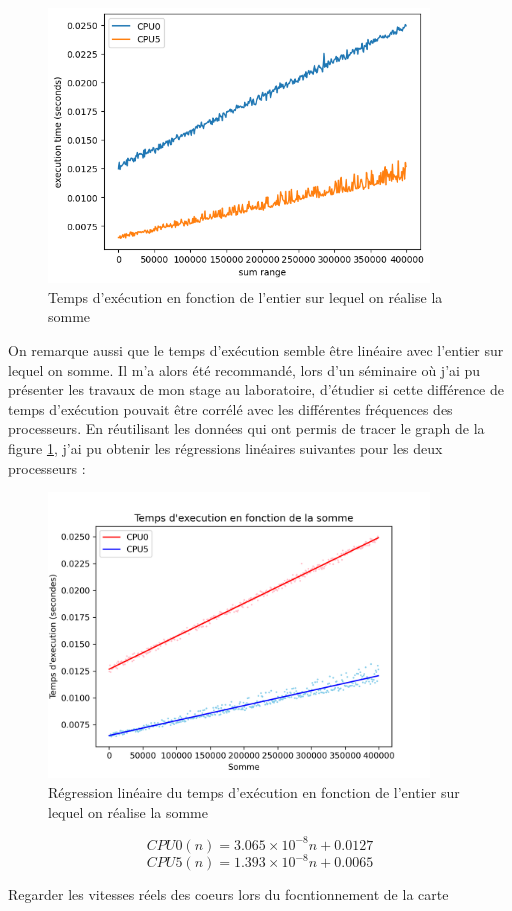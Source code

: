 \begin{figure}[H]
    \centering
    \includegraphics[width=0.9\textwidth]{Images/graphSum0and5.png}
    \caption{Temps d'exécution en fonction de l'entier sur lequel on réalise la somme}
    \label{fig:sum_int}    
\end{figure}


On remarque aussi que le temps d'exécution semble être linéaire avec l'entier sur lequel on somme. Il m'a alors été recommandé, lors d'un séminaire où j'ai pu présenter les travaux de mon stage au laboratoire, d'étudier si cette différence de temps d'exécution pouvait être corrélé avec les différentes fréquences des processeurs. En réutilisant les données qui ont permis de tracer le graph de la figure \ref{fig:sum_int}, j'ai pu obtenir les régressions linéaires suivantes pour les deux processeurs :

\begin{figure}[H]
    \centering
    \includegraphics[width=0.9\textwidth]{Images/linear_regression.png}
    \caption{Régression linéaire du temps d'exécution en fonction de l'entier sur lequel on réalise la somme}
\end{figure}
\[
    CPU0(n) =  3.065 \times 10^{-8} n +  0.0127 
\] 
\[
    CPU5(n) =  1.393 \times 10^{-8} n +  0.0065
\]


\begin{center}
    \color{red}
    Regarder les vitesses réels des coeurs lors du focntionnement de la carte
\end{center}